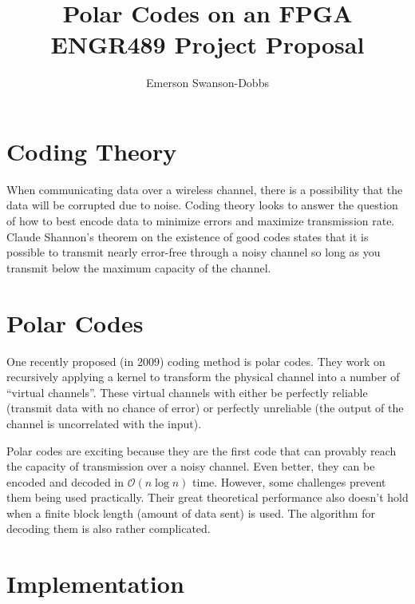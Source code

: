 \documentclass{article}
\title{\textbf{Polar Codes on an FPGA}\\ENGR489 Project Proposal}
\author{Emerson Swanson-Dobbs}
\date{}
\begin{document}
\maketitle

\section*{Coding Theory}
When communicating data over a wireless channel, there is a possibility that the data will be corrupted due to noise. Coding theory looks to answer the question of how to best encode data to minimize errors and maximize transmission rate. Claude Shannon's theorem on the existence of good codes states that it is possible to transmit nearly error-free through a noisy channel so long as you transmit below the maximum capacity of the channel.

\section*{Polar Codes}

One recently proposed (in 2009) coding method is polar codes. They work on recursively applying a kernel to transform the physical channel into a number of ``virtual channels''. These virtual channels with either be perfectly reliable (transmit data with no chance of error) or perfectly unreliable (the output of the channel is uncorrelated with the input).

Polar codes are exciting because they are the first code that can provably reach the capacity of transmission over a noisy channel. Even better, they can be encoded and decoded in \(\mathcal{O}(n\log{n})\) time. However, some challenges prevent them being used practically. Their great theoretical performance also doesn't hold when a finite block length (amount of data sent) is used. The algorithm for decoding them is also rather complicated.

\section*{Implementation}
\end{document}
